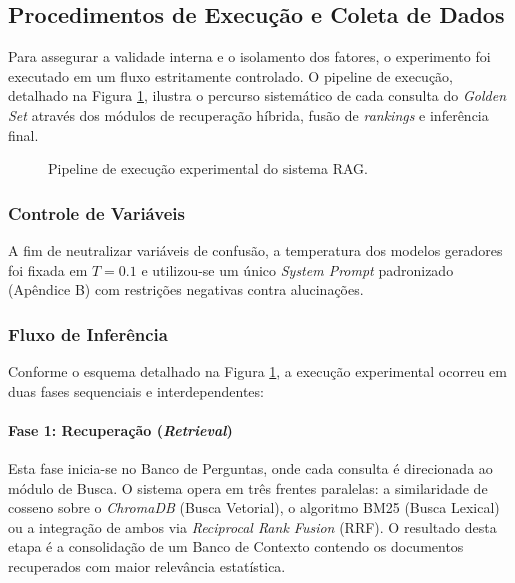 \subsection{Procedimentos de Execução e Coleta de Dados}

Para assegurar a validade interna e o isolamento dos fatores, o experimento foi executado em um fluxo estritamente controlado. O pipeline de execução, detalhado na Figura \ref{fig:rag_experimental_pipeline}, ilustra o percurso sistemático de cada consulta do \textit{Golden Set} através dos módulos de recuperação híbrida, fusão de \textit{rankings} e inferência final.

\begin{figure}[ht]
  \centering
  
  \caption{Pipeline de execução experimental do sistema RAG.}
  \label{fig:rag_experimental_pipeline}
\end{figure}

\subsubsection{Controle de Variáveis}

A fim de neutralizar variáveis de confusão, a temperatura dos modelos geradores foi fixada em $T = 0.1$ e utilizou-se um único \textit{System Prompt} padronizado (Apêndice B) com restrições negativas contra alucinações.

\subsubsection{Fluxo de Inferência}

Conforme o esquema detalhado na Figura \ref{fig:rag_experimental_pipeline}, a execução experimental ocorreu em duas fases sequenciais e interdependentes:

\paragraph{Fase 1: Recuperação (\textit{Retrieval})}
Esta fase inicia-se no Banco de Perguntas, onde cada consulta é direcionada ao módulo de Busca. O sistema opera em três frentes paralelas: a similaridade de cosseno sobre o \textit{ChromaDB} (Busca Vetorial), o algoritmo BM25 (Busca Lexical) ou a integração de ambos via \textit{Reciprocal Rank Fusion} (RRF). O resultado desta etapa é a consolidação de um Banco de Contexto contendo os documentos recuperados com maior relevância estatística.

